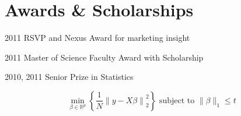 \documentclass{tccv}
\begin{document}

\section{Awards \& Scholarships}

\begin{yearlist}
\item{2011}
     {RSVP and Nexus Award \newline for marketing insight}
     {}
\item{2011}
     {Master of Science Faculty Award with Scholarship}
     {}

\item{2010, 2011}
     {Senior Prize in Statistics}
     {}
\end{yearlist}


$$
\min _{\beta \in \mathbb {R} ^{p}}\left\{{\frac {1}{N}}\left\|y-X\beta \right\|_{2}^{2}\right\}{\text{ subject to }}\|\beta \|_{1}\leq t
$$


\end{document}
